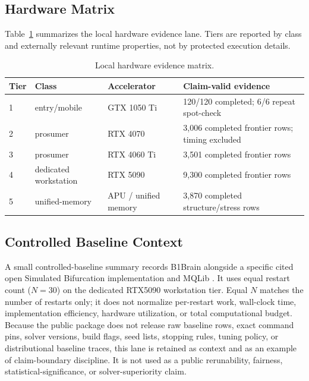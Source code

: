\documentclass[11pt]{article}
\begin{document}
\subsection{Hardware Matrix}
Table~\ref{tab:hardware} summarizes the local hardware evidence lane. Tiers are reported by class and externally relevant runtime properties, not by protected execution details.

\begin{table}[tbp]
\centering
\caption{Local hardware evidence matrix.}
\label{tab:hardware}
\small
\begin{tabular}{llll}
\toprule
Tier & Class & Accelerator & Claim-valid evidence \\
\midrule
1 & entry/mobile & GTX 1050 Ti & 120/120 completed; 6/6 repeat spot-check \\
2 & prosumer & RTX 4070 & 3,006 completed frontier rows; timing excluded \\
3 & prosumer & RTX 4060 Ti & 3,501 completed frontier rows \\
4 & dedicated workstation & RTX 5090 & 9,300 completed frontier rows \\
5 & unified-memory & APU / unified memory & 3,870 completed structure/stress rows \\
\bottomrule
\end{tabular}
\end{table}

\subsection{Controlled Baseline Context}
A small controlled-baseline summary records B1Brain alongside a specific cited open Simulated Bifurcation implementation \cite{openSB} and MQLib \cite{dunning2018mqlib}. It uses equal restart count ($N=30$) on the dedicated RTX5090 workstation tier. Equal $N$ matches the number of restarts only; it does not normalize per-restart work, wall-clock time, implementation efficiency, hardware utilization, or total computational budget. Because the public package does not release raw baseline rows, exact command pins, solver versions, build flags, seed lists, stopping rules, tuning policy, or distributional baseline traces, this lane is retained as context and as an example of claim-boundary discipline. It is not used as a public rerunability, fairness, statistical-significance, or solver-superiority claim.
\end{document}
